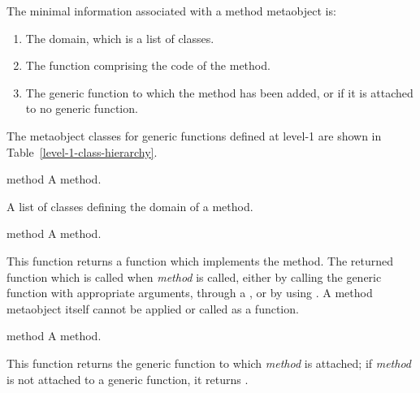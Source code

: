 \begin{optDefinition}
The minimal information associated with a method metaobject is:

\begin{enumerate}
    \item The domain, which is a list of classes.
    \item The function comprising the code of the method.
    \item The generic function to which the method has been added, or \nil\/ if it
    is attached to no generic function.
\end{enumerate}
%
The metaobject classes for generic functions defined at level-1 are
shown in Table~\ref{level-1-class-hierarchy}.

%
\begin{arguments}
    \item[method] A method.
\end{arguments}
%
\result%
A list of classes defining the domain of a method.

%
\begin{arguments}
    \item[method] A method.
\end{arguments}
%
\result%
This function returns a function which implements the method.  The returned
function which is called when {\em method} is called, either by calling the
generic function with appropriate arguments, through a
, or by using .  A method
metaobject itself cannot be applied or called as a function.

%
\begin{arguments}
    \item[method] A method.
\end{arguments}
%
\result%
This function returns the generic function to which {\em method} is attached; if
{\em method} is not attached to a generic function, it returns \nil.
\end{optDefinition}

